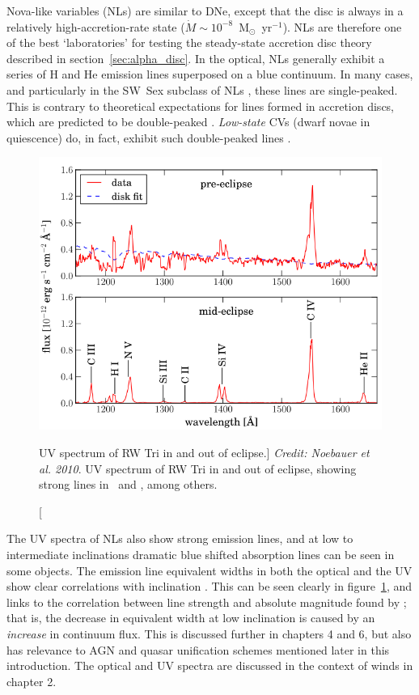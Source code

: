 Nova-like variables (NLs) are similar to DNe,
except that the disc is always in a relatively 
high-accretion-rate state ($\dot{M} \sim 10^{-8}$~M$_{\odot}$~yr$^{-1}$).
NLs are therefore one of the best `laboratories' for testing the steady-state
accretion disc theory described in section~\ref{sec:alpha_disc}.
In the optical, NLs generally exhibit a series of H and He emission 
lines superposed on a blue continuum. In many
cases, and particularly in the SW~Sex subclass of NLs
\citep{HSK86,DR95}, these lines are single-peaked. This is contrary to
theoretical expectations for lines formed in accretion discs, which
are predicted to be double-peaked \citep{smak1981, hornemarsh1986}. 
{\em Low-state} CVs (dwarf novae in quiescence) do, in fact,
exhibit such double-peaked lines \citep{marshhorne1990}. 

\nocite{dhillon1996,hessman1984}
\begin{figure}
\centering
\includegraphics[width=1.0\textwidth]{figures/02-outflows/rwtri_noe.png}
\caption
[UV spectrum of RW Tri in and out of eclipse.]
{
{\sl Credit: Noebauer et al. 2010}.
UV spectrum of RW Tri in and out of eclipse, showing strong lines in 
\civfull\ and \la, among others.
} 
\label{fig:NL_spec}
\end{figure}


The UV spectra of NLs also show strong emission lines, and at 
low to intermediate inclinations dramatic blue shifted absorption lines
can be seen in some objects. The emission line equivalent widths
in both the optical and the UV show clear correlations with 
inclination \citep{hessman1984,echevarria1988,noebauer}. 
This can be seen clearly in figure~\ref{fig:NL_spec}, and links to
the correlation between line strength and absolute magnitude found by \cite{patterson1984};
that is, the decrease in equivalent width at low inclination is caused by an {\em increase}
in continuum flux. This is discussed further in chapters 4 and 6, but also has 
relevance to AGN and quasar unification schemes mentioned later in this introduction.
The optical and UV spectra are discussed in the context of winds in chapter 2.

